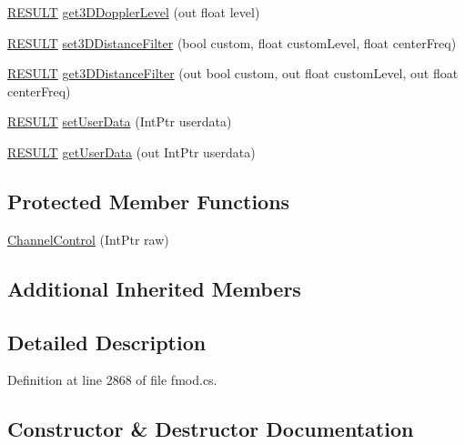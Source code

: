 \begin{DoxyCompactItemize}
\item 
\hyperlink{namespace_f_m_o_d_a305d1176ef3f8c8815861a60407ac33d}{R\+E\+S\+U\+LT} \hyperlink{class_f_m_o_d_1_1_channel_control_a3f7e173f285b5688f275f10ef0a14c47}{get3\+D\+Doppler\+Level} (out float level)
\item 
\hyperlink{namespace_f_m_o_d_a305d1176ef3f8c8815861a60407ac33d}{R\+E\+S\+U\+LT} \hyperlink{class_f_m_o_d_1_1_channel_control_a7ac40722cfe596b35b20250550bf045a}{set3\+D\+Distance\+Filter} (bool custom, float custom\+Level, float center\+Freq)
\item 
\hyperlink{namespace_f_m_o_d_a305d1176ef3f8c8815861a60407ac33d}{R\+E\+S\+U\+LT} \hyperlink{class_f_m_o_d_1_1_channel_control_ae11ed7a17c50c27c431ba586a986d786}{get3\+D\+Distance\+Filter} (out bool custom, out float custom\+Level, out float center\+Freq)
\item 
\hyperlink{namespace_f_m_o_d_a305d1176ef3f8c8815861a60407ac33d}{R\+E\+S\+U\+LT} \hyperlink{class_f_m_o_d_1_1_channel_control_a34f1de425bbb93ee49964c3f6098706a}{set\+User\+Data} (Int\+Ptr userdata)
\item 
\hyperlink{namespace_f_m_o_d_a305d1176ef3f8c8815861a60407ac33d}{R\+E\+S\+U\+LT} \hyperlink{class_f_m_o_d_1_1_channel_control_a1c52c267167efe7c3e06f812552e9684}{get\+User\+Data} (out Int\+Ptr userdata)
\end{DoxyCompactItemize}
\subsection*{Protected Member Functions}
\begin{DoxyCompactItemize}
\item 
\hyperlink{class_f_m_o_d_1_1_channel_control_a42ca683982c2ff735922b10ed123a209}{Channel\+Control} (Int\+Ptr raw)
\end{DoxyCompactItemize}
\subsection*{Additional Inherited Members}


\subsection{Detailed Description}


Definition at line 2868 of file fmod.\+cs.



\subsection{Constructor \& Destructor Documentation}
\mbox{\label{class_f_m_o_d_1_1_channel_control_a42ca683982c2ff735922b10ed123a209}} 
